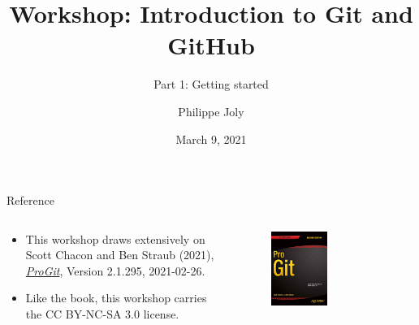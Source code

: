 \documentclass[handout]{beamer}
\title[Git/GitHub Workshop: Part 1]{Workshop: Introduction to Git and GitHub}
\subtitle{Part 1: Getting started}
\author[P. Joly]{Philippe Joly}
\institute[FU-Berlin]{Freie Universität Berlin}
\date{March 9, 2021}
\begin{document}
\begin{frame}
\titlepage
\end{frame}


%
%


\begin{frame}{Reference}
  \begin{columns}
  
    \begin{column}{0.5\textwidth}
    \begin{itemize}
      \item This workshop draws extensively on Scott Chacon and Ben Straub (2021), \href{https://git-scm.com/book/en/v2}{\textit{ProGit}}, Version 2.1.295, 2021-02-26. 
      \item Like the book, this workshop carries the CC BY-NC-SA 3.0 license. 
    \end{itemize}
		\end{column}
		
    \begin{column}{0.5\textwidth}
      \begin{figure}
	      \includegraphics[width=0.5\textwidth]{figures/progit_cover.png}
	      \caption{}
      \end{figure}
    \end{column}
  \end{columns}
\end{frame}
\end{document}
